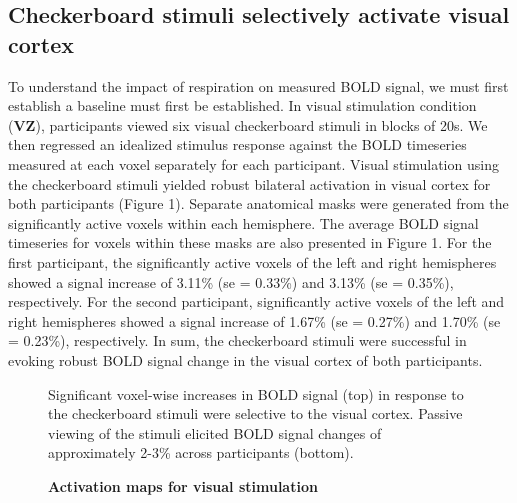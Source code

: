 \documentclass[9pt]{NEU502b-fmri}
\begin{document}
\subsection{Checkerboard stimuli selectively activate visual cortex}
To understand the impact of respiration on measured BOLD signal, we must first establish a baseline must first be established. In visual stimulation condition (\textbf{VZ}), participants viewed six visual checkerboard stimuli in blocks of 20s. We then regressed an idealized stimulus response against the BOLD timeseries measured at each voxel separately for each participant. Visual stimulation using the checkerboard stimuli yielded robust bilateral activation in visual cortex for both participants (Figure 1). Separate anatomical masks were generated from the significantly active voxels within each hemisphere. The average BOLD signal timeseries for voxels within these masks are also presented in Figure 1. For the first participant, the significantly active voxels of the left and right hemispheres showed a signal increase  of 3.11\% (se = 0.33\%) and 3.13\% (se = 0.35\%), respectively. For the second participant, significantly active voxels of the left and right hemispheres showed a signal increase  of 1.67\% (se = 0.27\%) and 1.70\% (se = 0.23\%), respectively. In sum, the checkerboard stimuli were successful in evoking robust BOLD signal change in the visual cortex of both participants. 

\begin{figure}
\centerline{%
%
}
\caption{\textbf{Activation maps for visual stimulation}}
\par Significant voxel-wise increases in BOLD signal (top) in response to the checkerboard stimuli were selective to the visual cortex. Passive viewing of the stimuli elicited BOLD signal changes of approximately 2-3\% across participants (bottom). 
\end{figure}
\end{document}
